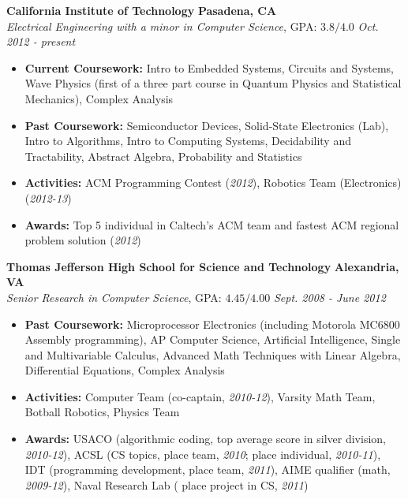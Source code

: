 \documentclass{article}
\newenvironment{changemargin}[2]{%
  \begin{list}{}{%
    \setlength{\topsep}{0pt}%
    \setlength{\leftmargin}{#1}%
    \setlength{\rightmargin}{#2}%
    \setlength{\listparindent}{\parindent}%
    \setlength{\itemindent}{\parindent}%
    \setlength{\parsep}{\parskip}%
  }%
  \item[]}{\end{list}
}
\newenvironment{body} {
	\vspace*{-16pt}
	\begin{changemargin}{-0.25in}{-0.5in}
  }	
	{\end{changemargin}
}
\begin{document}
\begin{body}
	\vspace{14pt}
	\textbf{California Institute of Technology} \hfill \textbf{Pasadena, CA}{} \\
	\emph{Electrical Engineering with a minor in Computer Science}, GPA: $3.8/4.0$ \hfill \emph{Oct. 2012 - present} \\
	\begin{itemize}
	\item \textbf{Current Coursework:} Intro to Embedded Systems, Circuits and Systems, Wave Physics (first of a three part course in Quantum Physics and Statistical Mechanics), Complex Analysis
	\item \textbf{Past Coursework:} Semiconductor Devices, Solid-State Electronics (Lab), Intro to Algorithms, Intro to Computing Systems, Decidability and Tractability, Abstract Algebra, Probability and Statistics
	\item \textbf{Activities:} ACM Programming Contest (\textit{2012}), Robotics Team (Electronics) (\textit{2012-13})
	\item \textbf{Awards:} Top 5 individual in Caltech's ACM team and fastest ACM regional problem solution (\textit{2012})
	\end{itemize}

	\medskip

	\textbf{Thomas Jefferson High School for Science and Technology} \hfill \textbf{Alexandria, VA} \\
	\emph{Senior Research in Computer Science}, GPA: $4.45/4.00$ \hfill \emph{Sept. 2008 - June 2012} \\
	\begin{itemize}
	\item \textbf{Past Coursework:} Microprocessor Electronics (including Motorola MC6800 Assembly programming), AP Computer Science, Artificial Intelligence, Single and Multivariable Calculus, Advanced Math Techniques with Linear Algebra, Differential Equations, Complex Analysis
	\item \textbf{Activities:} Computer Team (co-captain, \textit{2010-12}), Varsity Math Team, Botball Robotics, Physics Team
	\item \textbf{Awards:} USACO (algorithmic coding, top average score in silver division, \textit{2010-12}), ACSL (CS topics,  place team, \textit{2010};  place individual, \textit{2010-11}), IDT (programming development,  place team, \textit{2011}), AIME qualifier (math, \textit{2009-12}), Naval Research Lab ( place project in CS, \textit{2011})
	\end{itemize}
\end{body}
\end{document}

